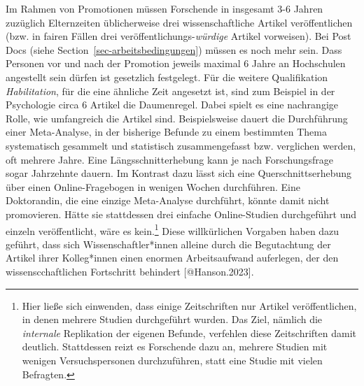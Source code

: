 \documentclass[
  letterpaper,
  DIV=11,
  numbers=noendperiod]{scrreprt}
\begin{document}
Im Rahmen von Promotionen müssen Forschende in insgesamt 3-6 Jahren
zuzüglich Elternzeiten üblicherweise drei wissenschaftliche Artikel
veröffentlichen (bzw. in fairen Fällen drei
veröffentlichungs-\emph{würdige} Artikel vorweisen). Bei Post Docs
(siehe Section~\ref{sec-arbeitsbedingungen}) müssen es noch mehr sein.
Dass Personen vor und nach der Promotion jeweils maximal 6 Jahre an
Hochschulen angestellt sein dürfen ist gesetzlich festgelegt. Für die
weitere Qualifikation \emph{Habilitation}, für die eine ähnliche Zeit
angesetzt ist, sind zum Beispiel in der Psychologie circa 6 Artikel die
Daumenregel. Dabei spielt es eine nachrangige Rolle, wie umfangreich die
Artikel sind. Beispielsweise dauert die Durchführung einer Meta-Analyse,
in der bisherige Befunde zu einem bestimmten Thema systematisch
gesammelt und statistisch zusammengefasst bzw. verglichen werden, oft
mehrere Jahre. Eine Längsschnitterhebung kann je nach Forschungsfrage
sogar Jahrzehnte dauern. Im Kontrast dazu lässt sich eine
Querschnittserhebung über einen Online-Fragebogen in wenigen Wochen
durchführen. Eine Doktorandin, die eine einzige Meta-Analyse durchführt,
könnte damit nicht promovieren. Hätte sie stattdessen drei einfache
Online-Studien durchgeführt und einzeln veröffentlicht, wäre es
kein.\footnote{Hier ließe sich einwenden, dass einige Zeitschriften nur
  Artikel veröffentlichen, in denen mehrere Studien durchgeführt wurden.
  Das Ziel, nämlich die \emph{internale} Replikation der eigenen
  Befunde, verfehlen diese Zeitschriften damit deutlich. Stattdessen
  reizt es Forschende dazu an, mehrere Studien mit wenigen
  Versuchspersonen durchzuführen, statt eine Studie mit vielen
  Befragten.} Diese willkürlichen Vorgaben haben dazu geführt, dass sich
Wissenschaftler*innen alleine durch die Begutachtung der Artikel ihrer
Kolleg*innen einen enormen Arbeitsaufwand auferlegen, der den
wissenscchaftlichen Fortschritt behindert {[}@Hanson.2023{]}.
\end{document}
